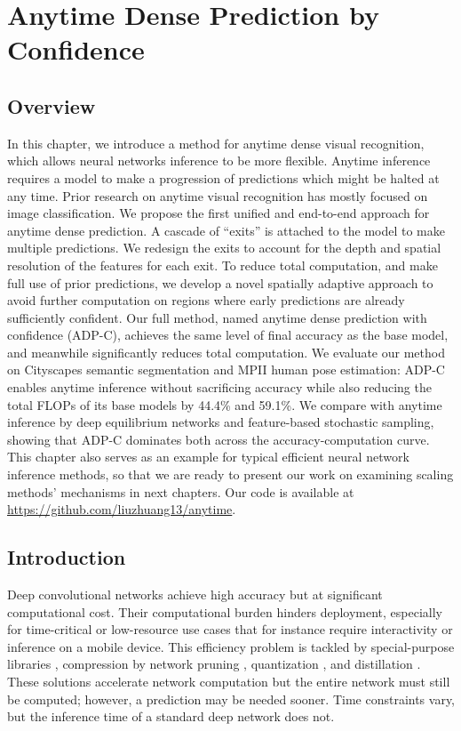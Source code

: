 \chapter{Anytime Dense Prediction by Confidence}
\label{chap:anytime}

\section{Overview}
In this chapter, we introduce a method for anytime dense visual recognition, which allows neural networks inference to be more flexible. Anytime inference requires a model to make a progression of predictions which might be halted at any time. Prior research on anytime visual recognition has mostly focused on image classification. We propose the first unified and end-to-end approach for anytime dense prediction. A cascade of ``exits'' is attached to the model to make multiple predictions. We redesign the exits to account for the depth and spatial resolution of the features for each exit. To reduce total computation, and make full use of prior predictions, we develop a novel spatially adaptive approach to avoid further computation on regions where early predictions are already sufficiently confident. Our full method, named anytime dense prediction with confidence (ADP-C), achieves the same level of final accuracy as the base model, and meanwhile significantly reduces total computation. We evaluate our method on Cityscapes semantic segmentation and MPII human pose estimation: ADP-C enables anytime inference without sacrificing accuracy while also reducing the total FLOPs of its base models by 44.4\% and 59.1\%. We compare with anytime inference by deep equilibrium networks and feature-based stochastic sampling, showing that ADP-C dominates both across the accuracy-computation curve. This chapter also serves as an example for typical efficient neural network inference methods, so that we are ready to present our work on examining scaling methods' mechanisms in next chapters. Our code is available at \url{https://github.com/liuzhuang13/anytime}.

\section{Introduction}
Deep convolutional networks \cite{alexnet,resnet} achieve high accuracy but at significant computational cost.
Their computational burden hinders deployment, especially for time-critical or low-resource use cases that for instance require interactivity or inference on a mobile device.
This efficiency problem is tackled by special-purpose libraries \cite{chetlur2014cudnn}, compression by network pruning
\cite{han2015learning,li2016pruning,liu2019rethinking}, quantization \cite{xnornet,jacob2018quantization}, and distillation \cite{hinton2015distilling,fitnet}.
These solutions accelerate network computation but the entire network must still be computed; however, a prediction may be needed sooner.
Time constraints vary, but the inference time of a standard deep network does not.


